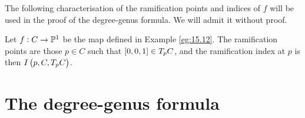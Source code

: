 The following characterisation of the ramification points and indices of $ f $ will be used in the proof of the degree-genus formula. We will admit it without proof.

\begin{proposition}
\label{prop:17.15}
Let $ f : C \to \P^1 $ be the map defined in Example \ref{eg:15.12}. The ramification points are those $ p \in C $ such that $ \sbr{0, 0, 1} \in T_pC $, and the ramification index at $ p $ is then $ I\br{p, C, T_pC} $.
\end{proposition}

\pagebreak

\section{The degree-genus formula}

